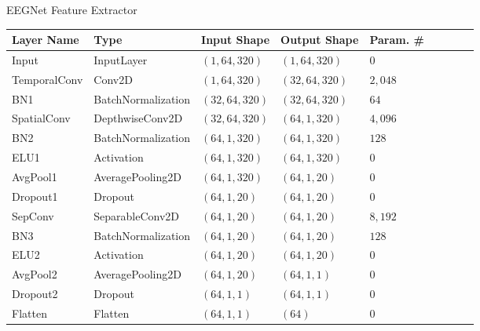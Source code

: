 \documentclass[aspectratio=169]{beamer}
\let\oldcite\cite %
\renewcommand{\cite}[1]{{\tiny\oldcite{#1}}}
\begin{document}


\begin{frame}{EEGNet Feature Extractor}

\begin{table}
\footnotesize
\begin{tabularx}{\linewidth}{p{2.85cm}p{3.5cm}p{2.85cm}p{2.85cm}lcccc}
\toprule
\textbf{Layer Name} & \textbf{Type} & \textbf{Input Shape} & \textbf{Output Shape} & \textbf{Param. \#} \\
\midrule
Input        & InputLayer         & $(1,64,320)$   & $(1,64,320)$   & $0$ \\
TemporalConv & Conv2D             & $(1,64,320)$   & $(32,64,320)$  & $2{,}048$ \\
BN1          & BatchNormalization & $(32,64,320)$  & $(32,64,320)$  & $64$ \\
SpatialConv  & DepthwiseConv2D    & $(32,64,320)$  & $(64,1,320)$   & $4{,}096$ \\
BN2          & BatchNormalization & $(64,1,320)$   & $(64,1,320)$   & $128$ \\
ELU1         & Activation         & $(64,1,320)$   & $(64,1,320)$   & $0$ \\
AvgPool1     & AveragePooling2D   & $(64,1,320)$   & $(64,1,20)$    & $0$ \\
Dropout1     & Dropout            & $(64,1,20)$    & $(64,1,20)$    & $0$ \\
SepConv      & SeparableConv2D    & $(64,1,20)$    & $(64,1,20)$    & $8{,}192$ \\
BN3          & BatchNormalization & $(64,1,20)$    & $(64,1,20)$    & $128$ \\
ELU2         & Activation         & $(64,1,20)$    & $(64,1,20)$    & $0$ \\
AvgPool2     & AveragePooling2D   & $(64,1,20)$    & $(64,1,1)$     & $0$ \\
Dropout2     & Dropout            & $(64,1,1)$     & $(64,1,1)$     & $0$ \\
Flatten      & Flatten            & $(64,1,1)$     & $(64)$         & $0$ \\
\midrule


\end{tabularx}
\end{table}
\end{frame}
\end{document}
